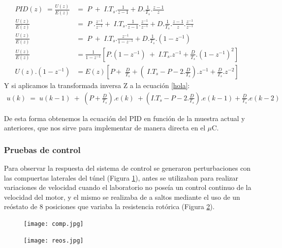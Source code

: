      \begin{align}
    PID(z)\;=\frac{U(z)}{E(z)}&=\;P\;+\;I.T_s.\frac1{z-1}+D.\frac1{T_s}.\frac{z-1}z \label{PIDZ}  \\[0.4cm]
    \frac{U(z)}{E(z)}&=\;P\;.\frac{z^{-1}}{z^{-1}}+\;I.T_s.\frac1{z-1}.\frac{z^{-1}}{z^{-1}}+D.\frac1{T_s}.\frac{z-1}z.\frac{z^{-1}}{z^{-1}}\;\\[0.4cm]
    \frac{U(z)}{E(z)}&=\;P\;+\;I.T_s.\frac{z^{-1}}{1-z^{-1}}+D.\frac1{T_s}.(1-z^{-1})\\[0.4cm]
    \frac{U(z)}{E(z)}&=\frac1{1-z^{-1}}\left[P.\left(1-z^{-1}\right)\;+\;I.T_s.z^{-1}+\frac D{T_s}.(1-z^{-1})^2\right]\;\\[0.4cm]
    U(z).\left(1-z^{-1}\right)&=E(z)\left[P+\;\frac D{T_s}+\left(\;I.T_s-P-2.\frac D{T_s}\right).z^{-1}+\frac D{T_s}.z^{-2}\right]\;\label{hola}
    \end{align}
Y si aplicamos la transformada inversa Z a la ecuación \ref{hola}:
\begin{align}
	u(k)\;=\;u(k-1)\;+\;\left(P+\frac D{T_s}\right).e(k)\;+\left(I.T_s-P-2.\frac D{T_s}\right).e(k-1)+\frac D{T_s}.e(k-2)\label{ecdiscreta}
\end{align}

De esta forma obtenemos la ecuación del PID en función de la muestra actual y anteriores, que nos sirve para implementar de manera directa en el $\mu$C. 

\subsubsection{Pruebas de control}
Para observar la respuesta del sistema de control se generaron perturbaciones con las compuertas laterales del túnel (Figura \ref{fig:comp}), antes se utilizaban para realizar variaciones de velocidad \cite{barila1993desarrollo} cuando el laboratorio no poseía un control continuo de la velocidad del motor, y el mismo se realizaba de a saltos mediante el uso de un reóstato de 8 posiciones que variaba la resistencia rotórica (Figura \ref{fig:reos}). 

\begin{figure}[H]
	\centering
	\texttt{[image: comp.jpg]}
	\label{fig:comp}
\end{figure}

\begin{figure}[H]
	\centering
	\texttt{[image: reos.jpg]}
	\label{fig:reos}
\end{figure}


